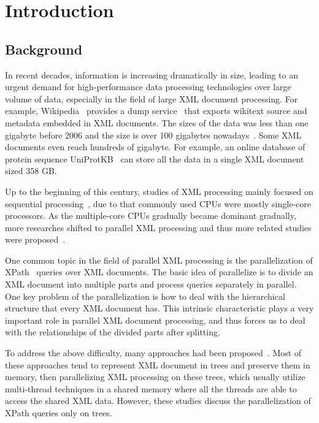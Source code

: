 
\chapter{Introduction}

\section{Background}

In recent decades, information is increasing dramatically in size, leading to an
urgent demand for high-performance data processing technologies over large volume
of data, especially in the field of large XML document processing. For example,
Wikipedia~\cite{wiki} provides a dump service~\cite{wikipediadump} that exports 
wikitext source and metadata embedded in XML documents. The sizes of the data 
was less than one gigabyte before 2006 and the size is over 100 gigabytes
nowadays~\cite{wikisize}. Some XML documents even reach hundreds of gigabyte.
For example, an online database of protein sequence UniProtKB~\cite{UniProtKB}
can store all the data in a single XML document sized 358 GB.


Up to the beginning of this century, studies of XML processing mainly 
focused on sequential processing~\cite{Skil97,AlJYK02,Ne02,ToGr02,HAJR03}, 
due to that commonly used CPUs were mostly single-core processors.
As the multiple-core CPUs gradually became dominant gradually, 
more researches shifted to parallel XML processing 
and thus more related studies were proposed~\cite{SAFu05,PaZC08,LFLQ08,ZhPC10}.

One common topic in the field of parallel XML processing is the parallelization of
XPath~\cite{xpath} queries over XML documents. The basic idea of parallelize is
to divide an XML document into multiple parts and process queries separately in
parallel. One key problem of the parallelization is how to deal with the
hierarchical structure that every XML document has. This intrinsic characteristic
plays a very important role in parallel XML document processing, and thus forces
us to deal with the relationships of the divided parts after splitting. 

To address the above difficulty, many approaches had been
proposed~\cite{JLWO03,SAFu05,NEMH07,BuLM08,Mats09,ZhPC10,ChLW13,HaMa16}. Most of
these approaches tend to represent XML document in trees and preserve them in
memory, then parallelizing XML processing on these trees, which usually utilize
multi-thread techniques in a shared memory where all the threads are able to
access the shared XML data. However, these studies discuss the parallelization
of XPath queries only on trees.

